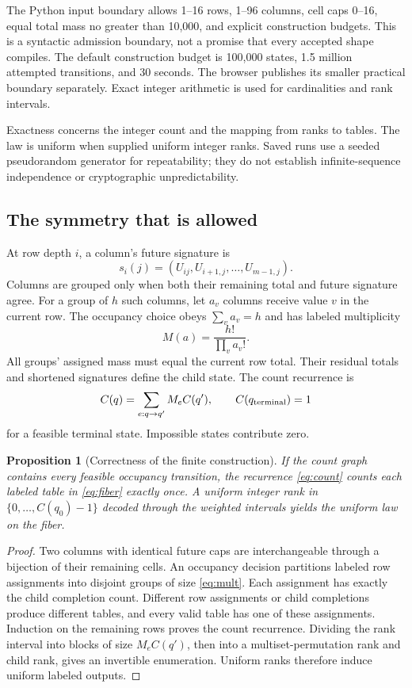 \documentclass[11pt,letterpaper]{article}
\newtheorem{proposition}{Proposition}
\begin{document}
The Python input boundary allows 1--16 rows, 1--96 columns, cell caps 0--16, equal total
mass no greater than 10,000, and explicit construction budgets. This is a syntactic
admission boundary, not a promise that every accepted shape compiles. The default
construction budget is 100,000 states, 1.5 million attempted transitions, and 30 seconds.
The browser publishes its smaller practical boundary separately. Exact integer arithmetic
is used for cardinalities and rank intervals.

Exactness concerns the integer count and the mapping from ranks to tables. The
law is uniform when supplied uniform integer ranks. Saved runs use a seeded
pseudorandom generator for repeatability; they do not establish infinite-sequence
independence or cryptographic unpredictability.

\subsection{The symmetry that is allowed}

At row depth $i$, a column's future signature is
\[
s_i(j)=(U_{ij},U_{i+1,j},\ldots,U_{m-1,j}).
\]
Columns are grouped only when both their remaining total and future signature agree.
For a group of $h$ such columns, let $a_v$ columns receive value $v$ in the current row.
The occupancy choice obeys $\sum_v a_v=h$ and has labeled multiplicity
\begin{equation}
M(a)=\frac{h!}{\prod_v a_v!}.
\label{eq:mult}
\end{equation}
All groups' assigned mass must equal the current row total. Their residual totals and
shortened signatures define the child state. The count recurrence is
\begin{equation}
C(q)=\sum_{e:q\rightarrow q'}M_eC(q'),\qquad C(q_{\rm terminal})=1
\label{eq:count}
\end{equation}
for a feasible terminal state. Impossible states contribute zero.

\begin{proposition}[Correctness of the finite construction]
If the count graph contains every feasible occupancy transition, the recurrence
\eqref{eq:count} counts each labeled table in \eqref{eq:fiber} exactly once. A uniform
integer rank in $\{0,\ldots,C(q_0)-1\}$ decoded through the weighted intervals yields
the uniform law on the fiber.
\end{proposition}
\begin{proof}
Two columns with identical future caps are interchangeable through a bijection of
their remaining cells. An occupancy decision partitions labeled row assignments
into disjoint groups of size \eqref{eq:mult}. Each assignment has exactly the child
completion count. Different row assignments or child completions produce different
tables, and every valid table has one of these assignments. Induction on the remaining
rows proves the count recurrence. Dividing the rank interval into blocks of size
$M_eC(q')$, then into a multiset-permutation rank and child rank, gives an invertible
enumeration. Uniform ranks therefore induce uniform labeled outputs.
\end{proof}
\end{document}
